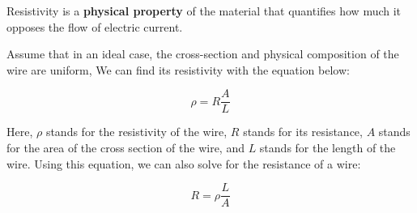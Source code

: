 Resistivity is a \textbf{physical property} of the material that quantifies how much it opposes the flow of electric current.

Assume that in an ideal case, the cross-section and physical composition of the wire are uniform, We can find its resistivity with the equation below:

$$\rho = R \frac{A}{L}$$

Here, $\rho$ stands for the resistivity of the wire, $R$ stands for its resistance, $A$ stands for the area of the cross section of the wire, and $L$ stands for the length of the wire. Using this equation, we can also solve for the resistance of a wire:

$$R = \rho \frac{L}{A}$$


